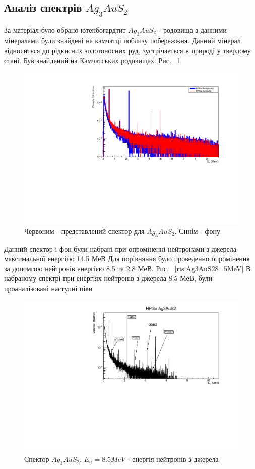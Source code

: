 \documentclass[a4paper, 14pt]{article}
\numberwithin{equation}{section}
\numberwithin{table}{section}
\begin{document}
\subsection{Аналіз спектрів $Ag_3AuS_2$}
За матеріал було обрано ютенбогардтит $Ag_3AuS_2$ - родовища з данними мінералами були знайдені на камчатці поблизу побережжня. Данний мінерал відноситься до рідкисних золотоносних руд, зустрічаеться в природі у твердому стані. Був знайдений на Камчатських родовищах. Рис. ~\ref{ris:Ag3AuS2Fon}	
\begin{figure}[hbt!]
	\centering \includegraphics[width=1\textwidth]{res/auFonAllLog.pdf}
	\caption{Червоним - представлений спектор для $Ag_3AuS_2$. Синім - фону} 
	\label{ris:Ag3AuS2Fon}	
\end{figure} 	
Данний спектор і фон були набрані при опроміненні нейтронами з джерела максимальної енергією 14.5 МеВ
Для порівняння було проведенно опромінення за допомгою нейтронів енергією 8.5 та 2.8 МеВ. Рис. ~\ref{ris:Ag3AuS28_5MeV}	
В набраному спектрі при енергіях нейтронів з джерела 8.5 МеВ, були проаналізовані наступні піки
\begin{figure}[hbt!]
	\centering \includegraphics[width=1\textwidth]{res/Au_AnzSpectr.pdf}
	\caption{Спектор $Ag_3AuS_2$, $E_{n} = 8.5 MeV$ - енергія нейтронів з джерела}
	\label{ris:Ag3AuS28_5MeVPick}	
\end{figure} 
\end{document}
